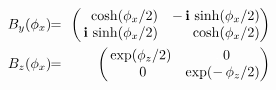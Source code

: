 \begin{frame}{\headingColor\bf\LARGE}
\begin{multicols}{2}
\begin{minipage}{7cm}
\begin{eqnarray*}
	\\
	B_{y}(\phi_{x})\!\!
	& = &
		\!\!\left(\!\!\begin{array}{rr} \cosh(\phi_{x}/2) & -\,\i\,\sinh(\phi_{x}/2) \\ \i\,\sinh(\phi_{x}/2) & \cosh(\phi_{x}/2) \end{array}\!\!\!\right)
	\\
	B_{z}(\phi_{x})\!\!
	&=&
		\!\!\left(\!\!\begin{array}{cc} \exp(\phi_{z}/2) & {\color{white}..}0 \\ {\color{white}.}0 & \exp(-\,\phi_{z}/2) \end{array}\!\!\!\right)
	\end{eqnarray*}
	\end{minipage}

\columnbreak


\end{multicols}
\end{frame}
